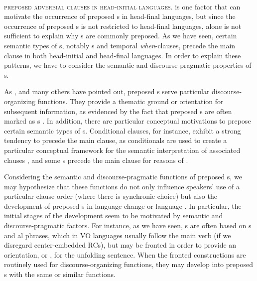 \documentclass[output=paper]{langsci/langscibook}
\begin{document}
\ea\label{ex:diessel:17}~\\
\z

\textsc{preposed} \textsc{adverbial} \textsc{clauses} \textsc{in} \textsc{head-initial} \textsc{languages}.  is one factor that can motivate the occurrence of preposed s in head-final languages, but since the occurrence of preposed s is not restricted to head-final languages,  alone is not sufficient to explain why s are commonly preposed. As we have seen, certain semantic types of s, notably s and temporal \textit{when}-clauses, precede the main clause in both head-initial and head-final languages. In order to explain these patterns, we have to consider the semantic and discourse-pragmatic properties of s.

As \citet{Chafe1984}, \citet{Givón1984} and many others have pointed out, preposed s serve particular discourse-organizing functions. They provide a thematic ground or orientation for subsequent information, as evidenced by the fact that preposed s are often marked as s \citep{Haiman1978}. In addition, there are particular conceptual motivations to prepose certain semantic types of s. Conditional clauses, for instance, exhibit a strong tendency to precede the main clause, as conditionals are used to create a particular conceptual framework for the semantic interpretation of associated clauses \citep{Diessel2005}, and some s precede the main clause for reasons of  \citep{Diessel2008}. 

Considering the semantic and discourse-pragmatic functions of preposed s, we may hypothesize that these functions do not only influence speakers’ use of a particular clause order (where there is synchronic choice) but also the development of preposed s in language change or language . In particular, the initial stages of the development seem to be motivated by semantic and discourse-pragmatic factors. For instance, as we have seen, s are often based on s and al phrases, which in VO languages usually follow the main verb (if we disregard center-embedded RCs), but may be fronted in order to provide an orientation, or , for the unfolding sentence. When the fronted constructions are routinely used for discourse-organizing functions, they may develop into preposed s with the same or similar functions. 
\end{document}
